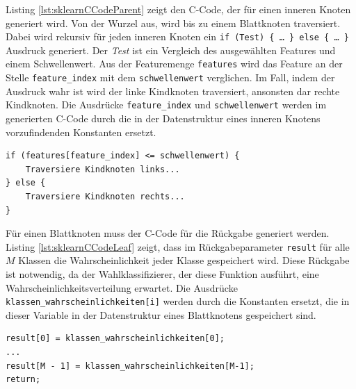 Listing \ref{lst:sklearnCCodeParent} zeigt den C-Code, der für einen inneren Knoten generiert wird. Von der Wurzel aus, wird bis zu einem Blattknoten traversiert. Dabei wird rekursiv für jeden inneren
Knoten ein \texttt{if (Test) \{ \ldots\ \} else \{ \ldots\ \}} Ausdruck generiert. Der \textit{Test} ist ein Vergleich des ausgewählten Features und einem Schwellenwert. Aus der Featuremenge \texttt{features}
wird das Feature an der Stelle \texttt{feature\_index} mit dem \texttt{schwellenwert} verglichen. Im Fall, indem der Ausdruck wahr ist wird der linke Kindknoten traversiert, ansonsten dar rechte Kindknoten.
Die Ausdrücke \texttt{feature\_index} und \texttt{schwellenwert} werden im generierten C-Code durch die in der Datenstruktur eines inneren Knotens vorzufindenden Konstanten ersetzt.
\begin{lstlisting}[label=lst:sklearnCCodeParent,caption={C-Code eines inneren Knotens.}]
if (features[feature_index] <= schwellenwert) {
    Traversiere Kindknoten links...
} else {
    Traversiere Kindknoten rechts...
}
\end{lstlisting}
Für einen Blattknoten muss der C-Code für die Rückgabe generiert werden. Listing \ref{lst:sklearnCCodeLeaf} zeigt, dass im Rückgabeparameter \texttt{result} für alle $M$ Klassen die Wahrscheinlichkeit
jeder Klasse gespeichert wird. Diese Rückgabe ist notwendig, da der Wahlklassifizierer, der diese Funktion ausführt, eine Wahrscheinlichkeitsverteilung erwartet.
Die Ausdrücke \texttt{klassen\_wahrscheinlichkeiten[i]} werden durch die Konstanten ersetzt, die in dieser Variable in der Datenstruktur eines Blattknotens gespeichert sind.
\begin{lstlisting}[label=lst:sklearnCCodeLeaf,caption={C-Code eines Blattknotens.}]
result[0] = klassen_wahrscheinlichkeiten[0];
...
result[M - 1] = klassen_wahrscheinlichkeiten[M-1];
return;
\end{lstlisting}

